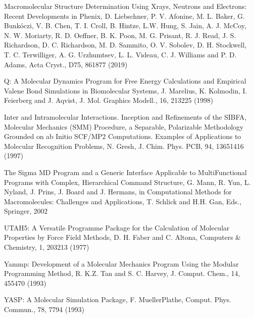 \documentclass[letterpaper,11pt,english]{sphinxmanual}
\begin{document}

Macromolecular Structure Determination Using X\sphinxhyphen{}rays, Neutrons and Electrons: Recent Developments in Phenix, D. Liebschner, P. V. Afonine, M. L. Baker, G. Bunkóczi, V. B. Chen, T. I. Croll, B. Hintze, L.\sphinxhyphen{}W. Hung, S. Jain, A. J. McCoy, N. W. Moriarty, R. D. Oeffner, B. K. Poon, M. G. Prisant, R. J. Read, J. S. Richardson, D. C. Richardson, M. D. Sammito, O. V. Sobolev, D. H. Stockwell, T. C. Terwilliger, A. G. Urzhumtsev, L. L. Videau, C. J. Williams and P. D. Adams, Acta Cryst., D75, 861\sphinxhyphen{}877 (2019)


Q: A Molecular Dynamics Program for Free Energy Calculations and Empirical Valene Bond Simulations in Biomolecular Systems, J. Marelius, K. Kolmodin, I. Feierberg and J. Aqvist, J. Mol. Graphics Modell., 16, 213\sphinxhyphen{}225 (1998)


Inter\sphinxhyphen{} and Intramolecular Interactions. Inception and Refinements of the SIBFA, Molecular Mechanics (SMM) Procedure, a Separable, Polarizable Methodology Grounded on ab Initio SCF/MP2 Computations. Examples of Applications to Molecular Recognition Problems, N. Gresh, J. Chim. Phys. PCB, 94, 1365\sphinxhyphen{}1416 (1997)


The Sigma MD Program and a Generic Interface Applicable to Multi\sphinxhyphen{}Functional Programs with Complex, Hierarchical Command Structure, G. Mann, R. Yun, L. Nyland, J. Prins, J. Board and J. Hermans, in Computational Methods for Macromolecules: Challenges and Applications, T. Schlick and H.\sphinxhyphen{}H. Gan, Eds., Springer, 2002


UTAH5: A Versatile Programme Package for the Calculation of Molecular Properties by Force Field Methods, D. H. Faber and C. Altona, Computers \& Chemistry, 1, 203\sphinxhyphen{}213 (1977)


Yammp: Development of a Molecular Mechanics Program Using the Modular Programming Method, R. K.\sphinxhyphen{}Z. Tan and S. C. Harvey, J. Comput. Chem., 14, 455\sphinxhyphen{}470 (1993)


YASP: A Molecular Simulation Package, F. Mueller\sphinxhyphen{}Plathe, Comput. Phys. Commun., 78, 77\sphinxhyphen{}94 (1993)
\end{document}
